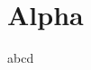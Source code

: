 \documentclass{book}
\begin{document}
\chapter{Alpha}
a\newpage b\newpage c\newpage d
\end{document}
